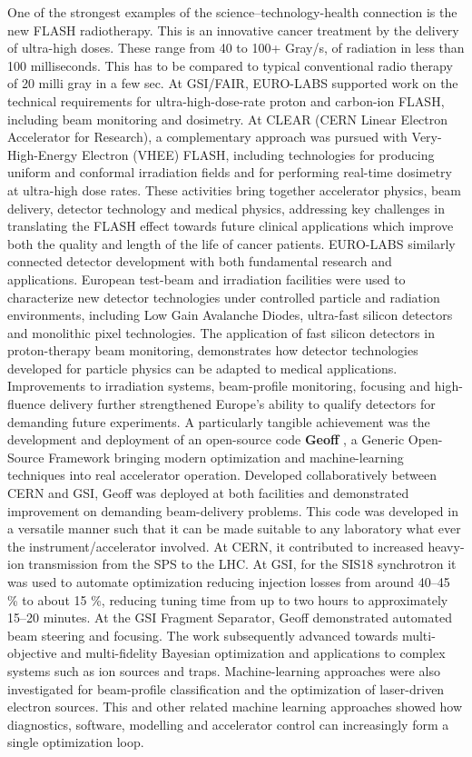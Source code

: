 \begin{itemize}
One of the strongest examples of the science–technology-health connection is the new FLASH radiotherapy. This is an innovative cancer treatment by the delivery of ultra-high doses. These range from 40 to 100+ Gray/s, of radiation in less than 100 milliseconds. This has to be compared to typical conventional radio therapy of 20 milli gray in a few sec. At GSI/FAIR, EURO-LABS supported work on the technical requirements for ultra-high-dose-rate proton and carbon-ion FLASH, including beam monitoring and dosimetry. At CLEAR (CERN Linear Electron Accelerator for Research), a complementary approach was pursued with Very-High-Energy Electron (VHEE) FLASH, including technologies for producing uniform and conformal irradiation fields and for performing real-time dosimetry at ultra-high dose rates. These activities bring together accelerator physics, beam delivery, detector technology and medical physics, addressing key challenges in translating the FLASH effect towards future clinical applications which improve both the quality and length of the life of cancer patients.
EURO-LABS similarly connected detector development with both fundamental research and applications. European test-beam and irradiation facilities were used to characterize new detector technologies under controlled particle and radiation environments, including Low Gain Avalanche Diodes, ultra-fast silicon detectors and monolithic pixel technologies. The application of fast silicon detectors in proton-therapy beam monitoring, demonstrates how detector technologies developed for particle physics can be adapted to medical applications. Improvements to irradiation systems, beam-profile monitoring, focusing and high-fluence delivery further strengthened Europe’s ability to qualify detectors for demanding future experiments.
A particularly tangible achievement was the development and deployment of an open-source code \textbf{ Geoff } , a Generic Open-Source Framework bringing modern optimization and machine-learning techniques into real accelerator operation. Developed collaboratively between CERN and GSI, Geoff was deployed at both facilities and demonstrated improvement on demanding beam-delivery problems. This code was developed in a versatile manner such that it can be made suitable to any laboratory what ever the instrument/accelerator involved. At CERN, it contributed to increased heavy-ion transmission from the SPS to the LHC. At GSI, for the SIS18 synchrotron it was used to automate optimization reducing injection losses from around 40–45 \% to about 15 \%, reducing tuning time from up to two hours to approximately 15–20 minutes. At the GSI Fragment Separator, Geoff demonstrated automated beam steering and focusing. The work subsequently advanced towards multi-objective and multi-fidelity Bayesian optimization and applications to complex systems such as ion sources and traps. Machine-learning approaches were also investigated for beam-profile classification and the optimization of laser-driven electron sources. This and other related machine learning approaches showed how diagnostics, software, modelling and accelerator control can increasingly form a single optimization loop.

\end{itemize}
